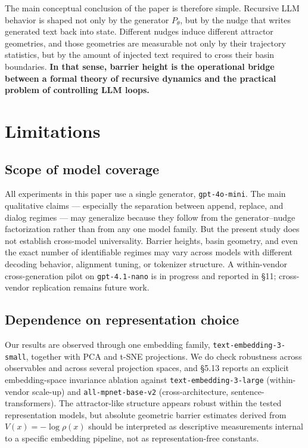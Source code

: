 \documentclass{article}
\theoremstyle{plain}
\theoremstyle{definition}
\begin{document}
The main conceptual conclusion of the paper is therefore simple.
Recursive LLM behavior is shaped not only by the generator $P_\theta$,
but by the nudge that writes generated text back into state. Different
nudges induce different attractor geometries, and those geometries
are measurable not only by their trajectory statistics, but by the
amount of injected text required to cross their basin boundaries.
\textbf{In that sense, barrier height is the operational bridge between a
formal theory of recursive dynamics and the practical problem of
controlling LLM loops.}


\section{Limitations}

\subsection{Scope of model coverage}

All experiments in this paper use a single generator, \texttt{gpt-4o-mini}.
The main qualitative claims — especially the separation between
append, replace, and dialog regimes — may generalize because they
follow from the generator–nudge factorization rather than from any
one model family. But the present study does not establish cross-model
universality. Barrier heights, basin geometry, and even the exact
number of identifiable regimes may vary across models with different
decoding behavior, alignment tuning, or tokenizer structure. A
within-vendor cross-generation pilot on \texttt{gpt-4.1-nano} is in progress
and reported in §11; cross-vendor replication remains future work.

\subsection{Dependence on representation choice}

Our results are observed through one embedding family,
\texttt{text-embedding-3-small}, together with PCA and t-SNE projections. We
do check robustness across observables and across several projection
spaces, and §5.13 reports an explicit embedding-space invariance
ablation against \texttt{text-embedding-3-large} (within-vendor scale-up)
and \texttt{all-mpnet-base-v2} (cross-architecture, sentence-transformers).
The attractor-like structure appears robust within the tested
representation models, but absolute geometric barrier estimates derived
from $V(x) = -\log \rho(x)$ should be interpreted as descriptive
measurements internal to a specific embedding pipeline, not as
representation-free constants.
\end{document}
